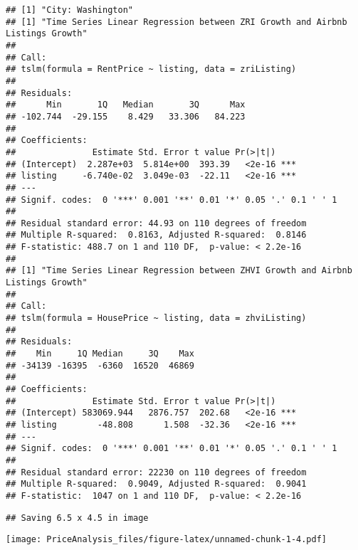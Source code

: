 \documentclass[
]{article}
\begin{document}
\begin{verbatim}
## [1] "City: Washington"
## [1] "Time Series Linear Regression between ZRI Growth and Airbnb Listings Growth"
## 
## Call:
## tslm(formula = RentPrice ~ listing, data = zriListing)
## 
## Residuals:
##      Min       1Q   Median       3Q      Max 
## -102.744  -29.155    8.429   33.306   84.223 
## 
## Coefficients:
##               Estimate Std. Error t value Pr(>|t|)    
## (Intercept)  2.287e+03  5.814e+00  393.39   <2e-16 ***
## listing     -6.740e-02  3.049e-03  -22.11   <2e-16 ***
## ---
## Signif. codes:  0 '***' 0.001 '**' 0.01 '*' 0.05 '.' 0.1 ' ' 1
## 
## Residual standard error: 44.93 on 110 degrees of freedom
## Multiple R-squared:  0.8163, Adjusted R-squared:  0.8146 
## F-statistic: 488.7 on 1 and 110 DF,  p-value: < 2.2e-16
## 
## [1] "Time Series Linear Regression between ZHVI Growth and Airbnb Listings Growth"
## 
## Call:
## tslm(formula = HousePrice ~ listing, data = zhviListing)
## 
## Residuals:
##    Min     1Q Median     3Q    Max 
## -34139 -16395  -6360  16520  46869 
## 
## Coefficients:
##               Estimate Std. Error t value Pr(>|t|)    
## (Intercept) 583069.944   2876.757  202.68   <2e-16 ***
## listing        -48.808      1.508  -32.36   <2e-16 ***
## ---
## Signif. codes:  0 '***' 0.001 '**' 0.01 '*' 0.05 '.' 0.1 ' ' 1
## 
## Residual standard error: 22230 on 110 degrees of freedom
## Multiple R-squared:  0.9049, Adjusted R-squared:  0.9041 
## F-statistic:  1047 on 1 and 110 DF,  p-value: < 2.2e-16
\end{verbatim}

\begin{verbatim}
## Saving 6.5 x 4.5 in image
\end{verbatim}

\texttt{[image: PriceAnalysis\_files/figure-latex/unnamed-chunk-1-4.pdf]}
\end{document}
